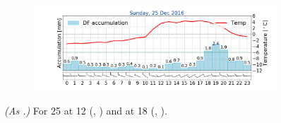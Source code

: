 \begin{figure}[ht!]
\begin{subfigure}[b]{0.49\textwidth}
		\includegraphics[trim={4.9cm 1.cm 1.5cm 1cm},clip,
		width=\textwidth]{./fig_weathermast/T_P_U_20161225}
		\caption{} \label{fig:TPU25}
	\end{subfigure}
	\caption{\textit{(As .)} For \SI{25}{\dec} at \SI{12}{\UTC} (\protect{}, \protect{}) and at \SI{18}{\UTC} (\protect{}, \protect{}).}\label{fig:weather:25}
\end{figure}

\newpage

